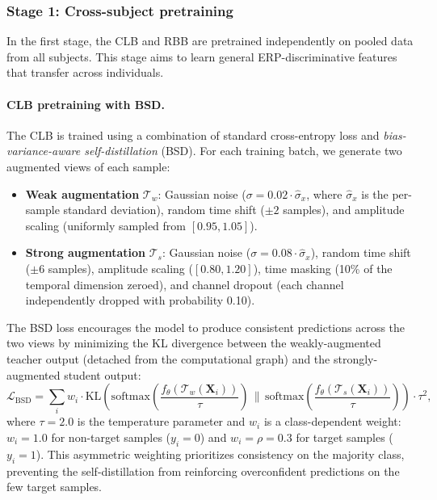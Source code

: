 \subsubsection{Stage 1: Cross-subject pretraining}\label{sec:pretrain}

In the first stage, the CLB and RBB are pretrained independently on pooled data from all subjects. This stage aims to learn general ERP-discriminative features that transfer across individuals.

\paragraph{CLB pretraining with BSD.}
The CLB is trained using a combination of standard cross-entropy loss and \emph{bias-variance-aware self-distillation} (BSD). For each training batch, we generate two augmented views of each sample:
\begin{itemize}
    \item \textbf{Weak augmentation} $\mathcal{T}_w$: Gaussian noise ($\sigma = 0.02 \cdot \hat{\sigma}_x$, where $\hat{\sigma}_x$ is the per-sample standard deviation), random time shift ($\pm 2$ samples), and amplitude scaling (uniformly sampled from $[0.95, 1.05]$).
    \item \textbf{Strong augmentation} $\mathcal{T}_s$: Gaussian noise ($\sigma = 0.08 \cdot \hat{\sigma}_x$), random time shift ($\pm 6$ samples), amplitude scaling ($[0.80, 1.20]$), time masking (10\% of the temporal dimension zeroed), and channel dropout (each channel independently dropped with probability 0.10).
\end{itemize}

The BSD loss encourages the model to produce consistent predictions across the two views by minimizing the KL divergence between the weakly-augmented teacher output (detached from the computational graph) and the strongly-augmented student output:
\begin{equation}\label{eq:bsd}
    \mathcal{L}_{\text{BSD}} = \sum_{i} w_i \cdot \text{KL}\!\left(\text{softmax}\!\left(\frac{f_\theta(\mathcal{T}_w(\mathbf{X}_i))}{\tau}\right) \,\Big\|\, \text{softmax}\!\left(\frac{f_\theta(\mathcal{T}_s(\mathbf{X}_i))}{\tau}\right)\right) \cdot \tau^2,
\end{equation}
where $\tau = 2.0$ is the temperature parameter and $w_i$ is a class-dependent weight: $w_i = 1.0$ for non-target samples ($y_i = 0$) and $w_i = \rho = 0.3$ for target samples ($y_i = 1$). This asymmetric weighting prioritizes consistency on the majority class, preventing the self-distillation from reinforcing overconfident predictions on the few target samples.


